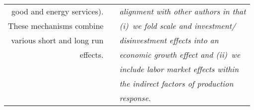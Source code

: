 \begin{table}
\begin{center}
\begin{tabular}{ r l l }
good and energy services).         &                                             & \emph{alignment with other authors in that} \\
These mechanisms combine           &                                             & \emph{(i)~we fold scale and investment/} \\
various short and long run         &                                             & \emph{disinvestment effects into an} \\
effects.                           &                                             & \emph{economic growth effect and (ii)~we} \\
                                   &                                             & \emph{include labor market effects within} \\ 
                                   &                                             & \emph{the indirect factors of production} \\
                                   &                                             & \emph{response.} \\
\bottomrule
\end{tabular}
\end{center}
\end{table}

